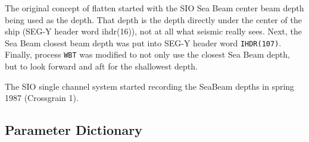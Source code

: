 The original concept of flatten started with the SIO Sea Beam center beam
depth being used as the depth.  That depth is the depth directly under
the center of the ship (SEG-Y header word ihdr(16)), not at all what
seismic really sees.  Next, the Sea Beam closest beam depth was put into
SEG-Y header word \texttt{IHDR(107)}.  Finally, process \texttt{WBT} was modified to not
only use the closest Sea Beam depth, but to look forward and aft for the
shallowest depth.

The SIO single channel system started recording the SeaBeam depths in
spring 1987 (Crossgrain 1).

\subsection{Parameter Dictionary}

